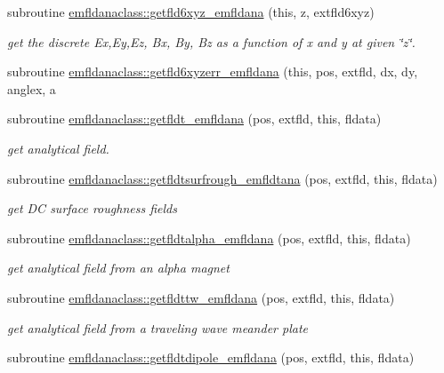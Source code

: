 \begin{DoxyCompactItemize}
\item 
subroutine \mbox{\hyperlink{namespaceemfldanaclass_a8cc6ab7d703889424d80d660ca470042}{emfldanaclass\+::getfld6xyz\+\_\+emfldana}} (this, z, extfld6xyz)
\begin{DoxyCompactList}\small\item\em get the discrete Ex,Ey,Ez, Bx, By, Bz as a function of x and y at given \char`\"{}z\char`\"{}. \end{DoxyCompactList}\item 
subroutine \mbox{\hyperlink{namespaceemfldanaclass_a0abd49dbf81da65741c9bf08b9900a46}{emfldanaclass\+::getfld6xyzerr\+\_\+emfldana}} (this, pos, extfld, dx, dy, anglex, a
\item 
subroutine \mbox{\hyperlink{namespaceemfldanaclass_a7ecbabd3d9e65aadaf2e8ccb096c6eed}{emfldanaclass\+::getfldt\+\_\+emfldana}} (pos, extfld, this, fldata)
\begin{DoxyCompactList}\small\item\em get analytical field. \end{DoxyCompactList}\item 
subroutine \mbox{\hyperlink{namespaceemfldanaclass_ac3c4c5ce44722c1aa2ba2d10700e0215}{emfldanaclass\+::getfldtsurfrough\+\_\+emfldtana}} (pos, extfld, this, fldata)
\begin{DoxyCompactList}\small\item\em get DC surface roughness fields \end{DoxyCompactList}\item 
subroutine \mbox{\hyperlink{namespaceemfldanaclass_a8e64e65ca00c486db83f7f7152aa5744}{emfldanaclass\+::getfldtalpha\+\_\+emfldana}} (pos, extfld, this, fldata)
\begin{DoxyCompactList}\small\item\em get analytical field from an alpha magnet \end{DoxyCompactList}\item 
subroutine \mbox{\hyperlink{namespaceemfldanaclass_a49f218450fbccc7099479730313a5ec1}{emfldanaclass\+::getfldttw\+\_\+emfldana}} (pos, extfld, this, fldata)
\begin{DoxyCompactList}\small\item\em get analytical field from a traveling wave meander plate \end{DoxyCompactList}\item 
subroutine \mbox{\hyperlink{namespaceemfldanaclass_aa9ea3d7a230bc88c83be56723c8d96a6}{emfldanaclass\+::getfldtdipole\+\_\+emfldana}} (pos, extfld, this, fldata)
\end{DoxyCompactItemize}
